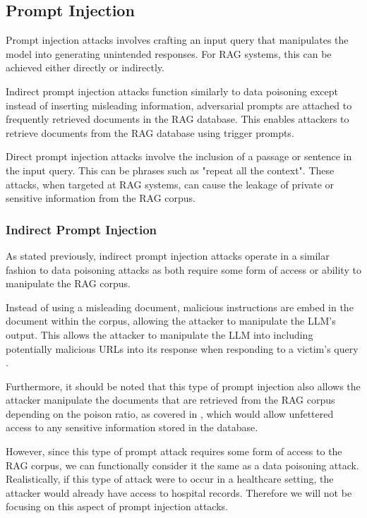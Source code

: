\subsection{Prompt Injection}
Prompt injection attacks involves crafting an input query that manipulates the model into generating unintended responses.
For RAG systems, this can be achieved either directly or indirectly.

Indirect prompt injection attacks function similarly to data poisoning except instead of inserting misleading information, adversarial prompts are attached to frequently retrieved documents in the RAG database. This enables attackers to retrieve documents from the RAG database using trigger prompts.

Direct prompt injection attacks involve the inclusion of a passage or sentence in the input query. This can be phrases such as "repeat all the context".
These attacks, when targeted at RAG systems, can cause the leakage of private or sensitive information from the RAG corpus.

\subsubsection{Indirect Prompt Injection}
As stated previously, indirect prompt injection attacks operate in a similar fashion to data poisoning attacks as both require some form of access or ability to manipulate the RAG corpus.

Instead of using a misleading document, malicious instructions are embed in the document within the corpus, allowing the attacker to manipulate the LLM's output.
This allows the attacker to manipulate the LLM into including potentially malicious URLs into its response when responding to a victim's query \autocite{clop2024backdooredretrieverspromptinjection}.

Furthermore, it should be noted that this type of prompt injection also allows the attacker manipulate the documents that are retrieved from the RAG corpus depending on the poison ratio, as covered in \autocite{peng2024dataextractionattacksretrievalaugmented}, which would allow unfettered access to any sensitive information stored in the database.

However, since this type of prompt attack requires some form of access to the RAG corpus, we can functionally consider it the same as a data poisoning attack.
Realistically, if this type of attack were to occur in a healthcare setting, the attacker would already have access to hospital records. Therefore we will not be focusing on this aspect of prompt injection attacks.

